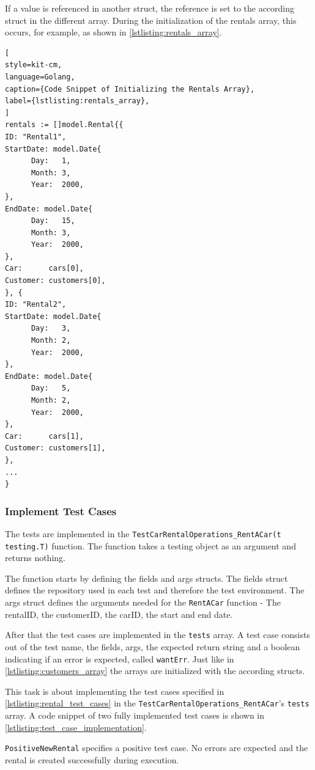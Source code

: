 If a value is referenced in another struct, the reference is set to the according struct in the different array.
During the initialization of the rentals array, this occurs, for example, as shown in \autoref{lstlisting:rentals_array}.

\begin{lstlisting}[
style=kit-cm,
language=Golang,
caption={Code Snippet of Initializing the Rentals Array},
label={lstlisting:rentals_array},
]
rentals := []model.Rental{{
ID: "Rental1",
StartDate: model.Date{
      Day:   1,
      Month: 3,
      Year:  2000,
},
EndDate: model.Date{
      Day:   15,
      Month: 3,
      Year:  2000,
},
Car:      cars[0],
Customer: customers[0],
}, {
ID: "Rental2",
StartDate: model.Date{
      Day:   3,
      Month: 2,
      Year:  2000,
},
EndDate: model.Date{
      Day:   5,
      Month: 2,
      Year:  2000,
},
Car:      cars[1],
Customer: customers[1],
},
...
}
\end{lstlisting}

\subsubsection*{Implement Test Cases}
The tests are implemented in the \texttt{TestCarRentalOperations\_RentACar(t \*testing.T)} function.
The function takes a testing object as an argument and returns nothing.

The function starts by defining the fields and args structs.
The fields struct defines the repository used in each test and therefore the test environment.
The args struct defines the arguments needed for the \texttt{RentACar} function - The rentalID, the customerID, the carID, the start and end date.

After that the test cases are implemented in the \texttt{tests} array.
A test case consists out of the test name, the fields, args, the expected return string and a boolean indicating if an error is expected, called \texttt{wantErr}.
Just like in \autoref{lstlisting:customers_array} the arrays are initialized with the according structs.

This task is about implementing the test cases specified in \autoref{lstlisting:rental_test_cases} in the \hfill \linebreak \texttt{TestCarRentalOperations\_RentACar}'s \texttt{tests} array.
A code snippet of two fully implemented test cases is shown in \autoref{lstlisting:test_case_implementation}.

\texttt{PositiveNewRental} specifies a positive test case.
No errors are expected and the rental is created successfully during execution.


